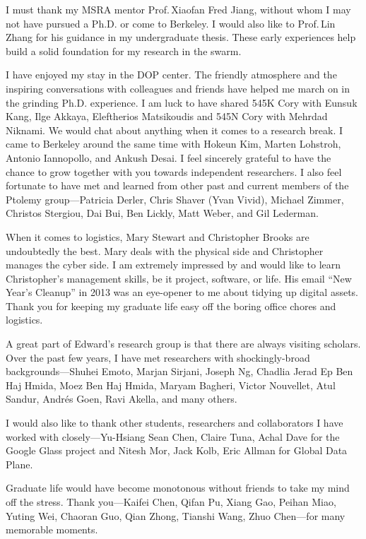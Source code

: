 \documentclass[thesis.tex]{subfiles}
\begin{document}
\begin{acknowledgements}
  I must thank my MSRA mentor Prof.\,Xiaofan Fred Jiang, without whom I may not
  have pursued a Ph.D. or come to Berkeley. I would also like to Prof.\,Lin
  Zhang for his guidance in my undergraduate thesis. These early experiences
  help build a solid foundation for my research in the swarm.

  I have enjoyed my stay in the DOP center. The friendly atmosphere and the
  inspiring conversations with colleagues and friends have helped me march on in
  the grinding Ph.D. experience. I am luck to have shared 545K Cory with Eunsuk
  Kang, Ilge Akkaya, Eleftherios Matsikoudis and 545N Cory with Mehrdad
  Niknami. We would chat about anything when it comes to a research break. I
  came to Berkeley around the same time with Hokeun Kim, Marten Lohstroh,
  Antonio Iannopollo, and Ankush Desai. I feel sincerely grateful to have the
  chance to grow together with you towards independent researchers. I also feel
  fortunate to have met and learned from other past and current members of the
  Ptolemy group---Patricia Derler, Chris Shaver (Yvan Vivid), Michael Zimmer,
  Christos Stergiou, Dai Bui, Ben Lickly, Matt Weber, and Gil Lederman.

  When it comes to logistics, Mary Stewart and Christopher Brooks are
  undoubtedly the best. Mary deals with the physical side and Christopher
  manages the cyber side. I am extremely impressed by and would like to learn
  Christopher's management skills, be it project, software, or life. His email
  ``New Year's Cleanup'' in 2013 was an eye-opener to me about tidying up
  digital assets. Thank you for keeping my graduate life easy off the boring
  office chores and logistics.

  A great part of Edward's research group is that there are always visiting
  scholars. Over the past few years, I have met researchers with
  shockingly-broad backgrounds---Shuhei Emoto, Marjan Sirjani, Joseph Ng,
  Chadlia Jerad Ep Ben Haj Hmida, Moez Ben Haj Hmida, Maryam Bagheri, Victor
  Nouvellet, Atul Sandur, Andr\'es Goen, Ravi Akella, and many others.

  I would also like to thank other students, researchers and collaborators I
  have worked with closely---Yu-Hsiang Sean Chen, Claire Tuna, Achal Dave for
  the Google Glass project and Nitesh Mor, Jack Kolb, Eric Allman for Global
  Data Plane.

  Graduate life would have become monotonous without friends to take my mind off
  the stress. Thank you---Kaifei Chen, Qifan Pu, Xiang Gao, Peihan Miao, Yuting
  Wei, Chaoran Guo, Qian Zhong, Tianshi Wang, Zhuo Chen---for many memorable
  moments.


\end{acknowledgements}
\end{document}
